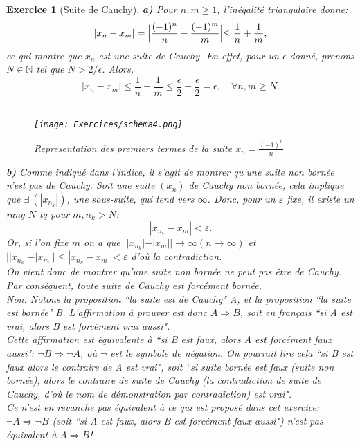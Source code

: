 \documentclass{article}
\newcommand{\Nn}{{\mathbb{N}}}
\theoremstyle{exercice}
\newtheorem{exercice}{Exercice}
\begin{document}
\begin{exercice}[Suite de Cauchy]
    
\textbf{a)} Pour $n,m \geq 1$, l'inégalité triangulaire donne:
\begin{equation}
    |x_n - x_m| = \Bigl\lvert\frac{(-1)^n}{n} - \frac{(-1)^m}{m}\Bigl\rvert \leq \frac{1}{n} + \frac{1}{m},
\end{equation}
ce qui montre que $x_n$ est une suite de Cauchy. En effet, pour un $\epsilon$ donné, prenons $N \in \Nn$ tel que $N > 2/\epsilon$. Alors,
\begin{equation}
    |x_n - x_m| \leq \frac{1}{n} + \frac{1}{m} \leq \frac{\epsilon}{2} + \frac{\epsilon}{2} = \epsilon, \quad \forall n,m \geq N.
\end{equation}
\\


\begin{figure}[H]
    \centering
    \texttt{[image: Exercices/schema4.png]}
    \caption{Representation des premiers termes de la suite $x_n=\frac{(-1)^n}{n}$}
    \label{fig:enter-label}
\end{figure}

\textbf{b)} Comme indiqué dans l'indice, il s'agit de montrer qu'une suite non bornée n'est pas de Cauchy.
Soit une suite $(x_n)$ de Cauchy non bornée, cela implique que $ \exists \  (|x_{n_k}|)$, une sous-suite, qui tend vers $\infty$. 
Donc, pour un $\varepsilon$ fixe, il existe un rang $N$ tq pour $m,n_k>N$: 
\begin{equation}
        |x_{n_k}-x_m|<\varepsilon.
\end{equation}
Or, si l'on fixe $m$ on a que $||x_{n_k}|-|x_m| |\to \infty (n\to \infty )$ et $||x_{n_k}|-|x_m| |\leq |x_{n_k}-x_m|<\varepsilon$ d'où la contradiction. \\

On vient donc de montrer qu'une suite non bornée ne peut pas être de Cauchy. Par conséquent, toute suite de Cauchy est forcément bornée. \\

\faLightbulbO \quad {} Non. Notons la proposition ``la suite est de Cauchy" A, et la proposition ``la suite est bornée" B. L'affirmation à prouver est donc $A \Rightarrow B$, soit en français ``si A est vrai, alors B est forcément vrai aussi". \\
Cette affirmation est équivalente à ``si B est faux, alors A est forcément faux aussi": $\neg B \Rightarrow \neg A$, où $\neg$ est le symbole de négation. On pourrait lire cela ``si B est faux alors le contraire de A est vrai", soit ``si suite bornée est faux (suite non bornée), alors le contraire de suite de Cauchy (la contradiction de suite de Cauchy, d'où le nom de démonstration par contradiction) est vrai".\\
Ce n'est en revanche pas équivalent à ce qui est proposé dans cet exercice: $\neg A \Rightarrow \neg B$ (soit ``si A est faux, alors B est forcément faux aussi") n'est pas équivalent à $A \Rightarrow B$!
\end{exercice}
\end{document}
